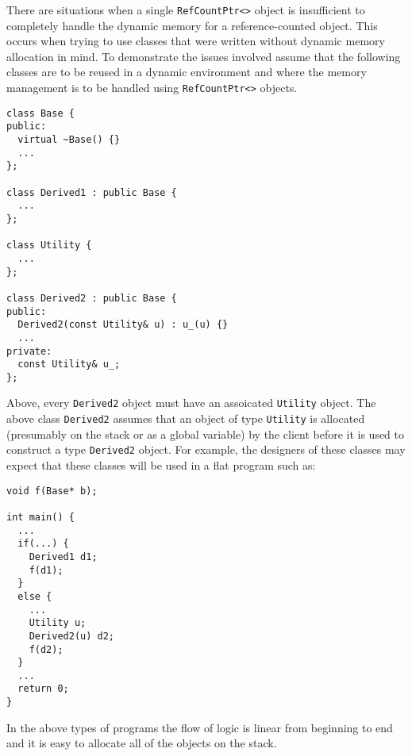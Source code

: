 There are situations when a single {}\texttt{RefCountPtr<>} object is
insufficient to completely handle the dynamic memory for a
reference-counted object.  This occurs when trying to use classes that
were written without dynamic memory allocation in mind.  To
demonstrate the issues involved assume that the following classes are
to be reused in a dynamic environment and where the memory management
is to be handled using {}\texttt{RefCountPtr<>} objects.
%
{\scriptsize\begin{verbatim}
class Base {
public:
  virtual ~Base() {}
  ...
};

class Derived1 : public Base {
  ...
};

class Utility {
  ...
};

class Derived2 : public Base {
public:
  Derived2(const Utility& u) : u_(u) {}
  ...
private:
  const Utility& u_;
};
\end{verbatim}}
%
{}\noindent{}Above, every {}\texttt{Derived2} object must have an
assoicated {}\texttt{Utility} object.  The above class
{}\texttt{Derived2} assumes that an object of type {}\texttt{Utility}
is allocated (presumably on the stack or as a global variable) by the
client before it is used to construct a type {}\texttt{Derived2}
object.  For example, the designers of these classes may expect that
these classes will be used in a flat program such as:
%
{\scriptsize\begin{verbatim}
void f(Base* b);

int main() {
  ...
  if(...) {
    Derived1 d1;
    f(d1);
  }
  else {
    ...
    Utility u;
    Derived2(u) d2;
    f(d2);
  }
  ...
  return 0;
}
\end{verbatim}}
%
\noindent{}
In the above types of programs the flow of logic is linear
from beginning to end and it is easy to allocate all of the objects on
the stack.

